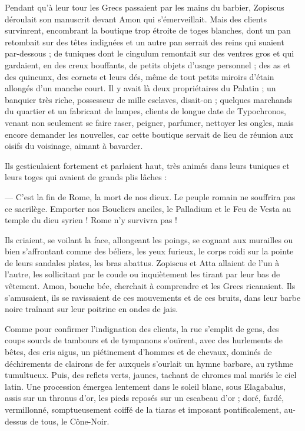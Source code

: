 \documentclass[a4paper, 11pt, oneside, polutonikogreek, french]{article}
\begin{document}
Pendant qu'à leur tour les Grecs passaient par les mains du barbier, Zopiscus déroulait son manuscrit devant Amon qui s'émerveillait. Mais des clients survinrent, encombrant la boutique trop étroite de toges blanches, dont un pan retombait sur des têtes indignées et un autre pan serrait des reins qui suaient par-dessous ; de tuniques dont le cingulum remontait sur des ventres gros et qui gardaient, en des creux bouffants, de petits objets d'usage personnel ; des as et des quincunx, des cornets et leurs dés, même de tout petits miroirs d'étain allongés d'un manche court. Il y avait là deux propriétaires du Palatin ; un banquier très riche, possesseur de mille esclaves, disait-on ; quelques marchands du quartier et un fabricant de lampes, clients de longue date de Typochronos, venant non seulement se faire raser, peigner, parfumer, nettoyer les ongles, mais encore demander les nouvelles, car cette boutique servait de lieu de réunion aux oisifs du voisinage, aimant à bavarder.

Ils gesticulaient fortement et parlaient haut, très animés dans leurs tuniques et leurs toges qui avaient de grands plis lâches :

--- C'est la fin de Rome, la mort de nos dieux. Le peuple romain ne souffrira pas ce sacrilège. Emporter nos Boucliers anciles, le Palladium et le Feu de Vesta au temple du dieu syrien ! Rome n'y survivra pas !

Ils criaient, se voilant la face, allongeant les poings, se cognant aux murailles ou bien s'affrontant comme des béliers, les yeux furieux, le corps roidi sur la pointe de leurs sandales plates, les bras abattus. Zopiscus et Atta allaient de l'un à l'autre, les sollicitant par le coude ou inquiètement les tirant par leur bas de vêtement. Amon, bouche bée, cherchait à comprendre et les Grecs ricanaient. Ils s'amusaient, ils se ravissaient de ces mouvements et de ces bruits, dans leur barbe noire traînant sur leur poitrine en ondes de jais.

Comme pour confirmer l'indignation des clients, la rue s'emplit de gens, des coups sourds de tambours et de tympanons s'ouïrent, avec des hurlements de bêtes, des cris aigus, un piétinement d'hommes et de chevaux, dominés de déchirements de clairons de fer auxquels s'ourlait un hymne barbare, au rythme tumultueux. Puis, des reflets verts, jaunes, tachant de chromes mal mariés le ciel latin. Une procession émergea lentement dans le soleil blanc, sous Elagabalus, assis sur un thronus d'or, les pieds reposés sur un escabeau d'or ; doré, fardé, vermillonné, somptueusement coiffé de la tiaras et imposant pontificalement, au-dessus de tous, le Cône-Noir.
\clearpage
\end{document}
